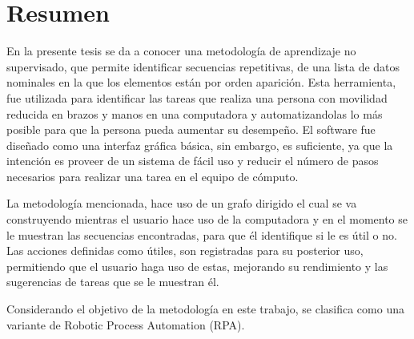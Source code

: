 \chapter{Resumen}
\label{sec:Resumen}

En la presente tesis se da a conocer una metodolog\'ia de aprendizaje no
 supervisado, que permite identificar secuencias repetitivas, de una lista de
 datos nominales en la que los elementos est\'an por orden aparici\'on. Esta 
 herramienta, fue utilizada para identificar las tareas que realiza una 
 persona con movilidad reducida en brazos y manos en una computadora y 
 automatizandolas lo m\'as posible para que la persona pueda 
 aumentar su desempe\~no. El software fue dise\~nado como una interfaz 
 gr\'afica b\'asica, sin embargo, es suficiente, ya que la intenci\'on es 
 proveer de un sistema de f\'acil uso y reducir el n\'umero de pasos 
 necesarios para realizar una tarea en el equipo de c\'omputo.


La metodolog\'ia mencionada, hace uso de un grafo dirigido el cual se va 
 construyendo mientras el usuario hace uso de la computadora y en el momento 
 se le muestran las secuencias encontradas, para que \'el identifique si le 
 es \'util o no. Las acciones definidas como \'utiles, son registradas para 
 su posterior uso, permitiendo que el usuario haga uso de estas, mejorando 
 su rendimiento y las sugerencias de tareas que se le muestran \'el.


Considerando el objetivo de la metodolog\'ia en este trabajo, se clasifica 
 como una variante de Robotic Process Automation (RPA).
